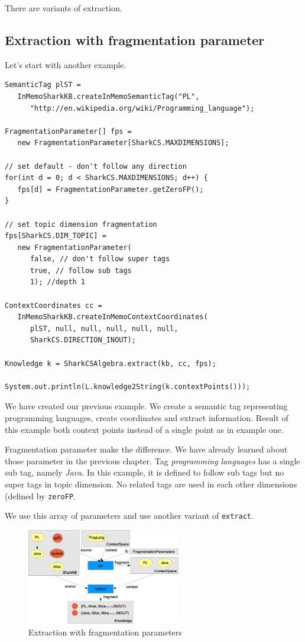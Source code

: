 There are variants of extraction.

\subsection{Extraction with fragmentation parameter}
Let's start with another example.

\begin{verbatim}
SemanticTag plST = 
   InMemoSharkKB.createInMemoSemanticTag("PL", 
      "http://en.wikipedia.org/wiki/Programming_language");

FragmentationParameter[] fps = 
   new FragmentationParameter[SharkCS.MAXDIMENSIONS];

// set default - don't follow any direction
for(int d = 0; d < SharkCS.MAXDIMENSIONS; d++) {
   fps[d] = FragmentationParameter.getZeroFP();
}

// set topic dimension fragmentation
fps[SharkCS.DIM_TOPIC] = 
   new FragmentationParameter(
      false, // don't follow super tags
      true, // follow sub tags
      1); //depth 1

ContextCoordinates cc = 
   InMemoSharkKB.createInMemoContextCoordinates(
      plST, null, null, null, null, null, 
      SharkCS.DIRECTION_INOUT);

Knowledge k = SharkCSAlgebra.extract(kb, cc, fps);

System.out.println(L.knowledge2String(k.contextPoints()));
\end{verbatim}

We have created our previous example. We create a semantic tag representing programming languages, create coordinates and extract information.
Result of this example both context points instead of a single point as in example one.

Fragmentation parameter make the difference. We have already learned about those parameter in the previous chapter. Tag {\it programming languages} has a single sub tag, namely {\it Java}. In this example, it is defined to follow sub tags but no super tags in topic dimension. No related tags are used in each other dimensions (defined by {\tt zeroFP}. 

We use this array of parameters and use another variant of {\tt extract}. 
\begin{figure}[t]
\centering
\includegraphics[width=0.60\textwidth]{extractionWithFPs.eps}
\caption{Extraction with fragmentation parameters}
\label{fig:extractionWithFPs}
\end{figure}

